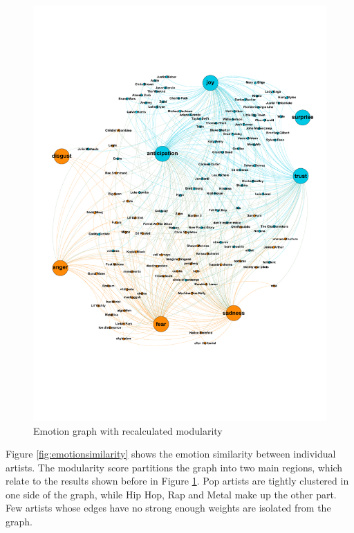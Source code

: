 \documentclass[10pt,a4paper]{article}
\begin{document}
		\begin{figure}[htb]
			\centering
			\includegraphics[trim=0mm 50mm 0mm 45mm, clip, width=\linewidth]{data/emotion_graph_new_modularity}
			\caption{Emotion graph with recalculated modularity}
			\label{fig:emotionnewmod}
		\end{figure}
		
		Figure \ref{fig:emotionsimilarity} shows the emotion similarity between individual artists. The modularity score partitions the graph into two main regions, which relate to the results shown before in Figure \ref{fig:emotionnewmod}. Pop artists are tightly clustered in one side of the graph, while Hip Hop, Rap and Metal make up the other part. Few artists whose edges have no strong enough weights are isolated from the graph.
		
\end{document}
